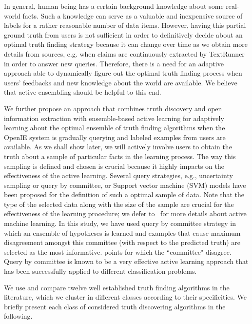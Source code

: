 In general, human being has a certain background knowledge about some real-world facts. Such a knowledge can serve as a valuable and inexpensive source of labels for a 
rather reasonable number of data items. However, having this partial ground truth from users is not sufficient in order to definitively decide about an optimal truth
finding strategy because it can change over time as we obtain more details from sources, e.g. when claims are continuously extracted by TextRunner in order to answer new 
queries. Therefore, there is a need for an adaptive approach able to dynamically figure out the optimal truth finding process when users' feedbacks and new knowledge about 
the world are available. We believe that active ensembling should be helpful to this end.

We further propose an approach that combines truth discovery and open information extraction with ensemble-based active learning for adaptively learning about the optimal 
ensemble of truth finding algorithms when the OpenIE system is gradually querying and labeled examples from users are available.
As we shall show later, we will actively involve users to obtain the truth about a sample of particular facts in the learning process. The way this sampling is defined and
chosen is crucial because it highly impacts on the effectiveness of the active learning. Several query strategies, e.g., uncertainty sampling or query by committee, or Support
vector machine (SVM) models have been proposed for the definition of such a optimal sample of data. Note that the type of the selected data along with the size of the sample are 
crucial for the effectiveness of the learning procedure; we defer to~\cite{burr12} for more details about active machine learning. In this study, we have used query by committee 
strategy in which an ensemble of hypotheses is learned and examples that cause maximum disagreement amongst this committee (with respect to the predicted truth) are selected as the 
most informative. points for which the ``committee" disagree. Query by committee is known to be a very effective active learning approach that has been successfully applied to different 
classification problems.



We use and compare twelve well established truth finding algorithms in the literature,
which we cluster in different classes according to their specificities.
We briefly present each class of considered truth discovering algorithms in the following.

